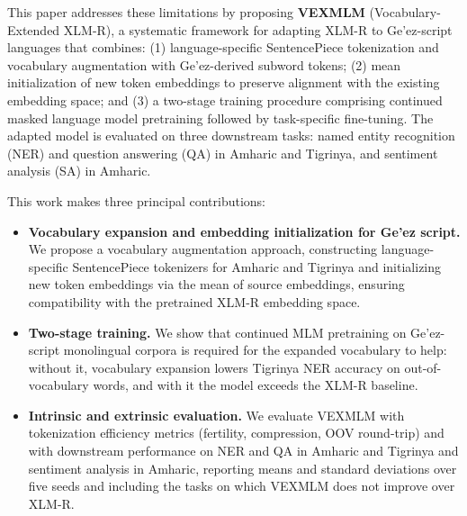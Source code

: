 This paper addresses these limitations by proposing \textbf{VEXMLM} (Vocabulary-Extended XLM-R), a systematic framework for adapting XLM-R to Ge'ez-script languages that combines: (1) language-specific SentencePiece tokenization and vocabulary augmentation with \vocabAdded{} Ge'ez-derived subword tokens; (2) mean initialization of new token embeddings to preserve alignment with the existing embedding space; and (3) a two-stage training procedure comprising continued masked language model pretraining followed by task-specific fine-tuning. The adapted model is evaluated on three downstream tasks: named entity recognition (NER) and question answering (QA) in Amharic and Tigrinya, and sentiment analysis (SA) in Amharic.

This work makes three principal contributions:
\begin{itemize}
    \item \textbf{Vocabulary expansion and embedding initialization for Ge'ez script.} We propose a vocabulary augmentation approach, constructing language-specific SentencePiece tokenizers for Amharic and Tigrinya and initializing new token embeddings via the mean of source embeddings, ensuring compatibility with the pretrained XLM-R embedding space.
    \item \textbf{Two-stage training.} We show that continued MLM pretraining on Ge'ez-script monolingual corpora is required for the expanded vocabulary to help: without it, vocabulary expansion lowers Tigrinya NER accuracy on out-of-vocabulary words, and with it the model exceeds the XLM-R baseline.
    \item \textbf{Intrinsic and extrinsic evaluation.} We evaluate VEXMLM with tokenization efficiency metrics (fertility, compression, OOV round-trip) and with downstream performance on NER and QA in Amharic and Tigrinya and sentiment analysis in Amharic, reporting means and standard deviations over five seeds and including the tasks on which VEXMLM does not improve over XLM-R.
\end{itemize}
